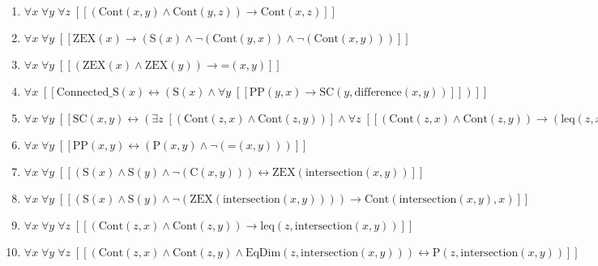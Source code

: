 \documentclass{article}
\begin{document}
\begin{enumerate}
\item $\forall x\; \forall y\; \forall z\;  \left[ \left[ \left(\textrm{Cont}(x,y) \land \textrm{Cont}(y,z)\right) \rightarrow \textrm{Cont}(x,z) \right] \right]$
\item $\forall x\; \forall y\;  \left[ \left[ \textrm{ZEX}(x) \rightarrow \left(\textrm{S}(x) \land \neg \left(\textrm{Cont}(y,x)\right) \land \neg \left(\textrm{Cont}(x,y)\right)\right) \right] \right]$
\item $\forall x\; \forall y\;  \left[ \left[ \left(\textrm{ZEX}(x) \land \textrm{ZEX}(y)\right) \rightarrow \textrm{=}(x,y) \right] \right]$
\item $\forall x\;  \left[ \left[ \textrm{Connected\_S}(x) \leftrightarrow \left(\textrm{S}(x) \land \forall y\;  \left[ \left[ \textrm{PP}(y,x) \rightarrow \textrm{SC}(y,\textrm{difference}(x,y)) \right] \right]\right) \right] \right]$
\item $\forall x\; \forall y\;  \left[ \left[ \textrm{SC}(x,y) \leftrightarrow \left(\exists z\;  \left[ \left(\textrm{Cont}(z,x) \land \textrm{Cont}(z,y)\right) \right] \land \forall z\;  \left[ \left[ \left(\textrm{Cont}(z,x) \land \textrm{Cont}(z,y)\right) \rightarrow \left(\textrm{leq}(z,x) \land \neg \left(\textrm{EqDim}(z,x)\right) \land \textrm{leq}(z,y) \land \neg \left(\textrm{EqDim}(z,y)\right)\right) \right] \right]\right) \right] \right]$
\item $\forall x\; \forall y\;  \left[ \left[ \textrm{PP}(x,y) \leftrightarrow \left(\textrm{P}(x,y) \land \neg \left(\textrm{=}(x,y)\right)\right) \right] \right]$
\item $\forall x\; \forall y\;  \left[ \left[ \left(\textrm{S}(x) \land \textrm{S}(y) \land \neg \left(\textrm{C}(x,y)\right)\right) \leftrightarrow \textrm{ZEX}(\textrm{intersection}(x,y)) \right] \right]$
\item $\forall x\; \forall y\;  \left[ \left[ \left(\textrm{S}(x) \land \textrm{S}(y) \land \neg \left(\textrm{ZEX}(\textrm{intersection}(x,y))\right)\right) \rightarrow \textrm{Cont}(\textrm{intersection}(x,y),x) \right] \right]$
\item $\forall x\; \forall y\; \forall z\;  \left[ \left[ \left(\textrm{Cont}(z,x) \land \textrm{Cont}(z,y)\right) \rightarrow \textrm{leq}(z,\textrm{intersection}(x,y)) \right] \right]$
\item $\forall x\; \forall y\; \forall z\;  \left[ \left[ \left(\textrm{Cont}(z,x) \land \textrm{Cont}(z,y) \land \textrm{EqDim}(z,\textrm{intersection}(x,y))\right) \leftrightarrow \textrm{P}(z,\textrm{intersection}(x,y)) \right] \right]$

\end{enumerate}
\end{document}
